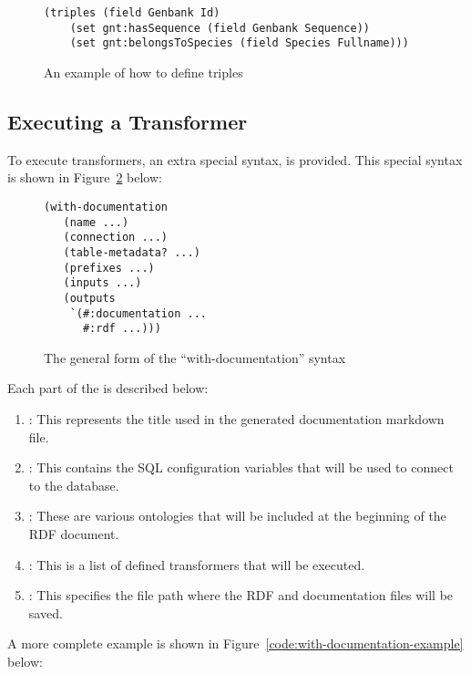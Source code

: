 \begin{figure}[H]
\centering
\begin{verbatim}
(triples (field Genbank Id)
    (set gnt:hasSequence (field Genbank Sequence))
    (set gnt:belongsToSpecies (field Species Fullname)))
\end{verbatim}
\caption{An example of how to define triples}\label{code:triples-example}
\end{figure}

\subsection{Executing a Transformer}

To execute transformers, an extra special syntax,  is provided.  This special syntax is shown in Figure~\ref{code:with-documentation-syntax} below:

\begin{figure}[H]
\centering
\begin{verbatim}
(with-documentation
   (name ...)
   (connection ...)
   (table-metadata? ...)
   (prefixes ...)
   (inputs ...)
   (outputs
    `(#:documentation ...
      #:rdf ...)))
\end{verbatim}
\caption{The general form of the ``with-documentation'' syntax}\label{code:with-documentation-syntax}
\end{figure}

Each part of the  is described below:

\begin{enumerate}
\item {}: This represents the title used in the generated documentation markdown file.
\item {}: This contains the SQL configuration variables that will be used to connect to the database.
\item {}: These are various ontologies that will be included at the beginning of the RDF document.
\item {}: This is a list of defined transformers that will be executed.
\item {}: This specifies the file path where the RDF and documentation files will be saved.
\end{enumerate}

A more complete example is shown in Figure~\ref{code:with-documentation-example} below:

